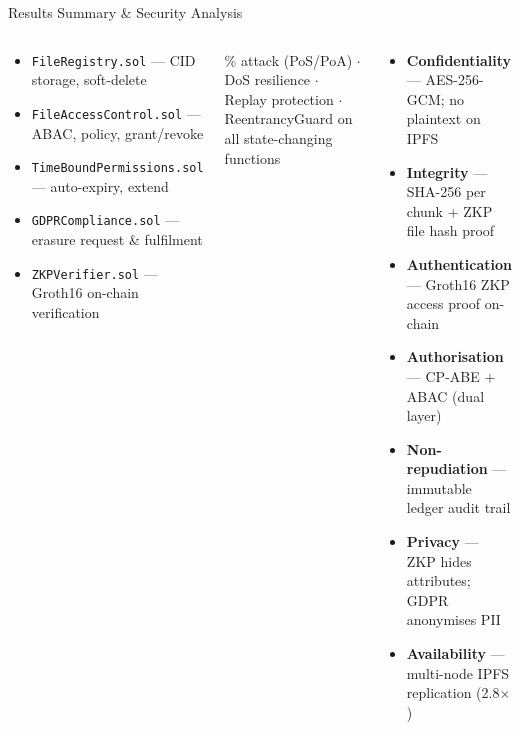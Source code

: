 \documentclass[aspectratio=169]{beamer}
\begin{document}
\begin{frame}{Results Summary \& Security Analysis}
\begin{columns}[t]
\begin{tcolorbox}[bluebox, title=\textbf{Smart Contracts Delivered}]
\scriptsize
\begin{itemize}
  \item \texttt{FileRegistry.sol} --- CID storage, soft-delete
  \item \texttt{FileAccessControl.sol} --- ABAC, policy, grant/revoke
  \item \texttt{TimeBoundPermissions.sol} --- auto-expiry, extend
  \item \texttt{GDPRCompliance.sol} --- erasure request \& fulfilment
  \item \texttt{ZKPVerifier.sol} --- Groth16 on-chain verification
\end{itemize}
\end{tcolorbox}
\vspace{0.15cm}
\begin{tcolorbox}[greenbox, title=\textbf{Attack Resistance}]
\scriptsize{}\% attack (PoS/PoA) $\cdot$ DoS resilience $\cdot$ Replay protection
$\cdot$ ReentrancyGuard on all state-changing functions
\end{tcolorbox}
\begin{tcolorbox}[redbox, title=\textbf{Security Guarantees}]
\scriptsize
\begin{itemize}
  \item \textbf{Confidentiality} --- AES-256-GCM; no plaintext on IPFS
  \item \textbf{Integrity} --- SHA-256 per chunk + ZKP file hash proof
  \item \textbf{Authentication} --- Groth16 ZKP access proof on-chain
  \item \textbf{Authorisation} --- CP-ABE + ABAC (dual layer)
  \item \textbf{Non-repudiation} --- immutable ledger audit trail
  \item \textbf{Privacy} --- ZKP hides attributes; GDPR anonymises PII
  \item \textbf{Availability} --- multi-node IPFS replication (2.8$\times$)
\end{itemize}
\end{tcolorbox}
\end{columns}
\end{frame}

\end{document}
